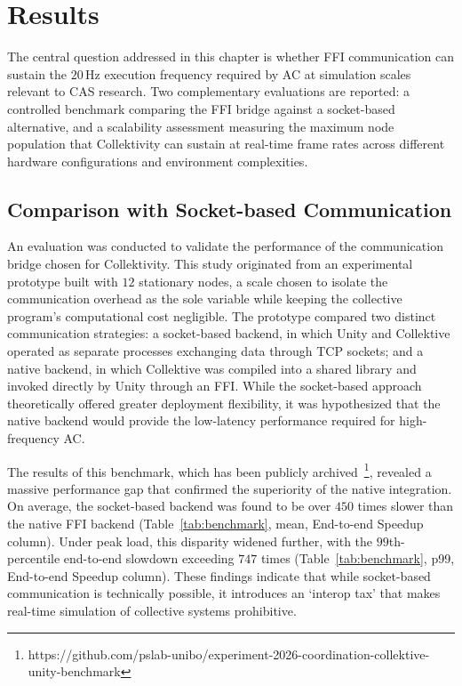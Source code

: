 \chapter{Results} \label{chap:results}

The central question addressed in this chapter is whether \ac{FFI} communication can sustain the $20\,\text{Hz}$ execution frequency required by \ac{AC} at simulation scales relevant to \ac{CAS} research. Two complementary evaluations are reported: a controlled benchmark comparing the \ac{FFI} bridge against a socket-based alternative, and a scalability assessment measuring the maximum node population that Collektivity can sustain at real-time frame rates across different hardware configurations and environment complexities.

\section{Comparison with Socket-based Communication} \label{sec:comparison}

An evaluation was conducted to validate the performance of the communication bridge chosen for Collektivity. This study originated from an experimental prototype built with $12$ stationary nodes, a scale chosen to isolate the communication overhead as the sole variable while keeping the collective program's computational cost negligible. The prototype compared two distinct communication strategies: a socket-based backend, in which Unity and Collektive operated as separate processes exchanging data through TCP sockets; and a native backend, in which Collektive was compiled into a shared library and invoked directly by Unity through an \ac{FFI}. While the socket-based approach theoretically offered greater deployment flexibility, it was hypothesized that the native backend would provide the low-latency performance required for high-frequency \ac{AC}.

The results of this benchmark, which has been publicly archived~\footnote{https://github.com/pslab-unibo/experiment-2026-coordination-collektive-unity-benchmark}, revealed a massive performance gap that confirmed the superiority of the native integration. On average, the socket-based backend was found to be over $450$ times slower than the native \ac{FFI} backend (Table~\ref{tab:benchmark}, mean, End-to-end Speedup column). Under peak load, this disparity widened further, with the $99$th-percentile end-to-end slowdown exceeding $747$ times (Table~\ref{tab:benchmark}, p99, End-to-end Speedup column). These findings indicate that while socket-based communication is technically possible, it introduces an `interop tax' that makes real-time simulation of collective systems prohibitive.

